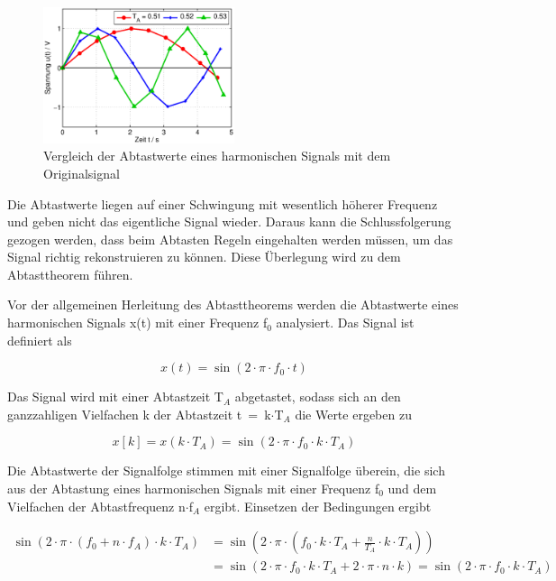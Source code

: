 \begin{figure}[H]
  \centerline{\includegraphics[width=0.5\textwidth]{Kapitel1/Bilder/image2}}
  \caption{Vergleich der Abtastwerte eines harmonischen Signals mit dem Originalsignal}
  \label{fig:Vergleich}
\end{figure}

\noindent Die Abtastwerte liegen auf einer Schwingung mit wesentlich höherer Frequenz und geben nicht das eigentliche Signal wieder. Daraus kann die Schlussfolgerung gezogen werden, dass beim Abtasten Regeln eingehalten werden müssen, um das Signal richtig rekonstruieren zu können. Diese Überlegung wird zu dem Abtasttheorem führen. 

\clearpage

\noindent Vor der allgemeinen Herleitung des Abtasttheorems werden die Abtastwerte eines harmonischen Signals x(t) mit einer Frequenz f$_{0}$ analysiert. Das Signal ist definiert als 

\begin{equation}\label{eq:twothree}
x\left(t\right)=\sin \left(2\cdot \pi \cdot f_{0} \cdot t\right)
\end{equation}

\noindent Das Signal wird mit einer Abtastzeit T${}_{A}$ abgetastet, sodass sich an den ganzzahligen Vielfachen k der Abtastzeit t~=~k$\cdot$T${}_{A}$ die Werte ergeben zu

\begin{equation}\label{eq:twofour}
x\left[k\right]=x\left(k\cdot T_{A} \right)=\sin \left(2\cdot \pi \cdot f_{0} \cdot k\cdot T_{A} \right)
\end{equation}

\noindent Die Abtastwerte der Signalfolge stimmen mit einer Signalfolge überein, die sich aus der Abtastung eines harmonischen Signals mit einer Frequenz f${}_{0}$ und dem Vielfachen der Abtastfrequenz n$\cdot$f${}_{A}$ ergibt. Einsetzen der Bedingungen ergibt 

\begin{equation}\label{eq:twofive}
\begin{split}
\sin \left(2\cdot \pi \cdot \left(f_{0} +n\cdot f_{A} \right)\cdot k\cdot T_{A} \right) 
& = \sin \left(2\cdot \pi \cdot \left(f_{0} \cdot k\cdot T_{A} +\frac{n}{T_{A} } \cdot k\cdot T_{A} \right)\right) \\ 
& = \sin \left(2\cdot \pi \cdot f_{0} \cdot k\cdot T_{A} +2\cdot \pi \cdot n\cdot k\right)=\sin \left(2\cdot \pi \cdot f_{0} \cdot k\cdot T_{A} \right)  
\end{split}
\end{equation}


